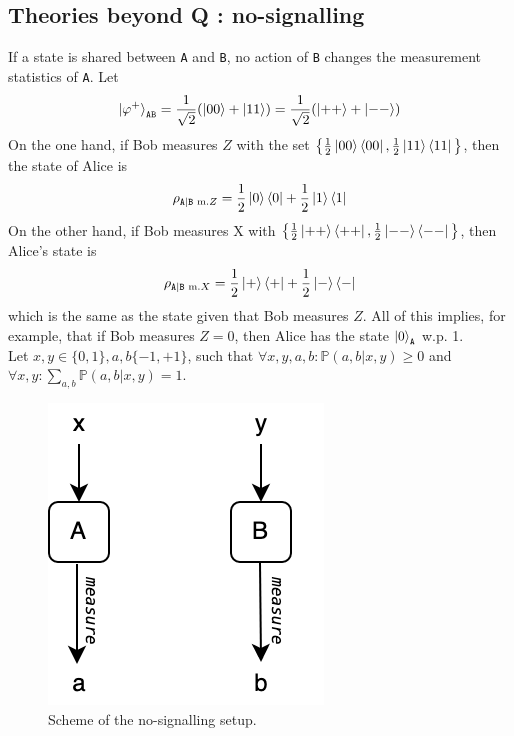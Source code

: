 \documentclass{article}
\begin{document}
\subsection{Theories beyond Q : no-signalling}
If a state is shared between \texttt{A} and \texttt{B}, no action of \texttt{B}
changes the measurement statistics of \texttt{A}. Let
\begin{equation}
    \ket{\varphi^+}_{\texttt{AB}}
        = \frac{1}{\sqrt2}(\ket{00} + \ket{11})
        = \frac{1}{\sqrt2}(\ket{++} + \ket{--})
\end{equation}
On the one hand, if Bob measures $Z$ with the set
$\big\{\frac{1}{2}\ket{00}\bra{00},\frac{1}{2}\ket{11}\bra{11} \big\}$, then the
state of Alice is
\begin{equation}
    \rho_{\texttt{A}|\texttt{B}\text{ m.}Z}
        = \frac{1}{2} \ket{0}\bra{0} + \frac{1}{2}\ket{1}\bra{1}
\end{equation}On the other hand, if
Bob measures X with
$\big\{\frac{1}{2}\ket{++}\bra{++},\frac{1}{2}\ket{--}\bra{--} \big\}$, then
Alice's state is
\begin{equation}
    \rho_{\texttt{A}|\texttt{B}\text{ m.}X}
        = \frac{1}{2}\ket{+}\bra{+} + \frac{1}{2}\ket{-}\bra{-}
\end{equation}
which is the same as the state given that Bob measures $Z$. All of this implies,
for example, that if Bob measures $Z = 0$, then Alice has the state
$\ket{0}_\texttt{A}$ w.p. 1. \newline \\\noindent Let $x, y\in \{0,1\}, a,
b\{-1, +1\}$, such that $\forall x, y, a, b : \mathbb{P}(a,b|x,y) \geq 0$ and
$\forall x, y : \sum_{a,b}\mathbb{P}(a,b|x,y) = 1$.
\begin{figure}[h]
    \centering
    \includegraphics[scale=0.4]{no-signalling.png}
    \caption{Scheme of the no-signalling setup.}
\end{figure}
\end{document}
